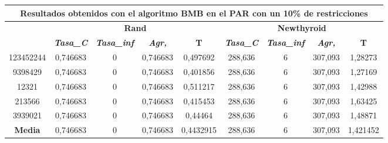 \documentclass[12pt, spanish]{article}
\begin{document}
\begin{table}[H]
\begin{tabular}{|c|c|c|c|c|c|c|c|c|}
\hline
\multicolumn{9}{|c|}{\textbf{Resultados obtenidos con el algoritmo BMB en el PAR con un 10\% de restricciones}}                                                                                                   \\ \hline
\multirow{2}{*}{} & \multicolumn{4}{c|}{\textbf{Rand}}                                                            & \multicolumn{4}{c|}{\textbf{Newthyroid}}                                                      \\ \cline{2-9} 
                  & \textit{\textbf{Tasa\_C}} & \textit{\textbf{Tasa\_inf}} & \textit{\textbf{Agr,}} & \textbf{T} & \textit{\textbf{Tasa\_C}} & \textit{\textbf{Tasa\_inf}} & \textit{\textbf{Agr,}} & \textbf{T} \\ \hline
123452244         & 0,746683                  & 0                           & 0,746683               & 0,497692   & 288,636                   & 6                           & 307,093                & 1,28273    \\ \hline
9398429           & 0,746683                  & 0                           & 0,746683               & 0,401856   & 288,636                   & 6                           & 307,093                & 1,27169    \\ \hline
12321             & 0,746683                  & 0                           & 0,746683               & 0,511217   & 288,636                   & 6                           & 307,093                & 1,42988    \\ \hline
213566            & 0,746683                  & 0                           & 0,746683               & 0,415453   & 288,636                   & 6                           & 307,093                & 1,63425    \\ \hline
3939021           & 0,746683                  & 0                           & 0,746683               & 0,44464    & 288,636                   & 6                           & 307,093                & 1,48871    \\ \hline
\textbf{Media}    & 0,746683                  & 0                           & 0,746683               & 0,4432915  & 288,636                   & 6                           & 307,093                & 1,421452   \\ \hline
\end{tabular}
\end{table}
\end{document}
